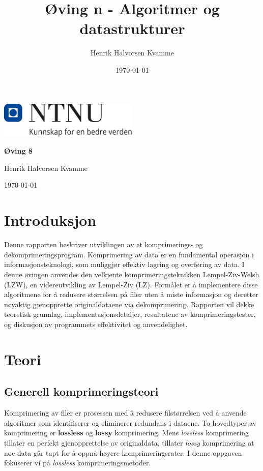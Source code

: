 \documentclass[12pt,a4paper]{article}
\title{Øving n - Algoritmer og datastrukturer}
\author{Henrik Halvorsen Kvamme}
\date{\today}
\begin{document}
\begin{center}
    \includegraphics[width=0.5\textwidth]{../images/NTNU_Logo.png}
    
    \vspace{1.5em}  %
    
    {\LARGE \textbf{Øving 8} \\[0.5em] }  %
    \vspace{1em}  %
    
    {\large Henrik Halvorsen Kvamme}\\  %
    \vspace{0.5em}  %
    
    {\today}  %
\end{center}

\vspace{2em}

\tableofcontents

\newpage

\section{Introduksjon}
Denne rapporten beskriver utviklingen av et komprimerings- og dekomprimeringsprogram. Komprimering av data er en fundamental operasjon i informasjonsteknologi, som muliggjør effektiv lagring og overføring av data. I denne øvingen anvendes den velkjente komprimeringsteknikken Lempel-Ziv-Welsh (LZW), en videreutvikling av Lempel-Ziv (LZ). Formålet er å implementere disse algoritmene for å redusere størrelsen på filer uten å miste informasjon og deretter nøyaktig gjenopprette originaldataene via dekomprimering. Rapporten vil dekke teoretisk grunnlag, implementasjonsdetaljer, resultatene av komprimeringstester, og diskusjon av programmets effektivitet og anvendelighet.

\section{Teori}
\subsection{Generell komprimeringsteori}
Komprimering av filer er prosessen med å redusere filstørrelsen ved å anvende algoritmer som identifiserer og eliminerer redundans i dataene. To hovedtyper av komprimering er \textbf{lossless} og \textbf{lossy} komprimering. Mens \textit{lossless} komprimering tillater en perfekt gjenopprettelse av originaldata, tillater \textit{lossy} komprimering at noe data går tapt for å oppnå høyere komprimeringsrater. I denne oppgaven fokuserer vi på \textit{lossless} komprimeringsmetoder.
\end{document}
